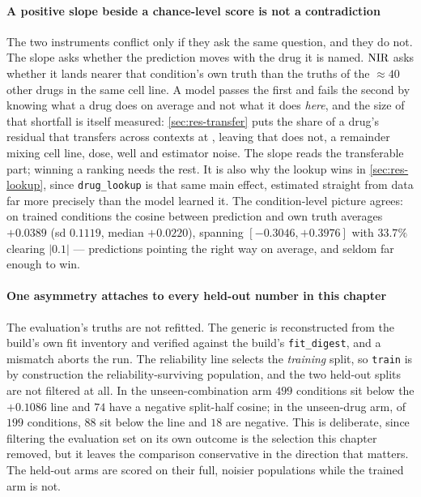 \paragraph{A positive slope beside a chance-level score is not a contradiction}
The two instruments conflict only if they ask the same question, and they do not.
The slope asks whether the prediction moves with the drug it is named. $\textrm{NIR}$ asks
whether it lands nearer that condition's own truth than the truths of the
$\approx 40$ other drugs in the same cell line. A model passes the first and fails
the second by knowing what a drug does on average and not what it does
\emph{here}, and the size of that shortfall is itself measured:
\cref{sec:res-transfer} puts the share of a drug's residual that transfers across
contexts at , leaving
 that does not, a remainder mixing cell line, dose,
well and estimator noise. The slope reads the transferable part; winning a ranking
needs the rest. It is also why the lookup wins in \cref{sec:res-lookup}, since
\texttt{drug\_lookup} is that same main effect, estimated straight from data far
more precisely than the model learned it. The condition-level picture agrees: on
trained conditions the cosine between prediction and own truth averages $+0.0389$
(sd $0.1119$, median $+0.0220$), spanning $[-0.3046, +0.3976]$ with $33.7\%$
clearing $|0.1|$ --- predictions pointing the right way on average, and seldom far
enough to win.

\paragraph{One asymmetry attaches to every held-out number in this chapter} The
evaluation's truths are not refitted. The generic is reconstructed from the
build's own fit inventory and verified against the build's \texttt{fit\_digest},
and a mismatch aborts the run. The reliability line selects the \emph{training}
split, so \texttt{train} is by construction the reliability-surviving population,
and the two held-out splits are not filtered at all. In the unseen-combination
arm $\num{499}$ conditions sit below the $+0.1086$ line and $\num{74}$ have a
negative split-half cosine; in the unseen-drug arm, of $\num{199}$ conditions,
$\num{88}$ sit below the line and $\num{18}$ are negative. This is deliberate,
since filtering the evaluation set on its own outcome is the selection this
chapter removed, but it leaves the comparison conservative in the direction that
matters. The held-out arms are scored on their full, noisier populations while
the trained arm is not.

